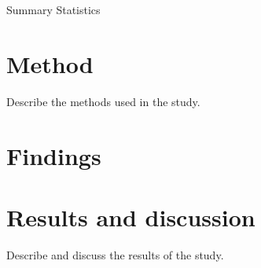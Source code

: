 \documentclass[12pt,a4paper,english]{article}
\begin{document}
\begin{table}[H]
    \centering
	
	\caption{Summary Statistics}
\end{table}

\section{Method}
Describe the methods used in the study.

\section{Findings}

\begin{figure}[htbp]
	\centering
	
	\caption{}
\end{figure}

\begin{figure}[htbp]
	\centering
	
	\caption{}
\end{figure}

\begin{figure}[htbp]
	\centering
	
	\caption{}
\end{figure}


\section{Results and discussion}
Describe and discuss the results of the study.


\theendnotes



\end{document}
